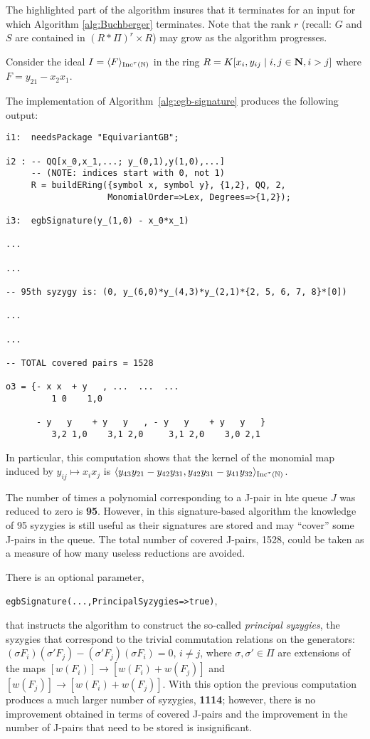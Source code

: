 The highlighted part of the algorithm insures that it terminates for an input for which Algorithm \ref{alg:Buchberger} terminates.
Note that the rank $r$ (recall: $G$ and $S$ are contained in $(R*\Pi)^r\times R$) may grow as the algorithm progresses. 

\begin{example}
Consider the ideal $I = \langle F \rangle_{\operatorname{Inc}^\tau(\mathbb N)}$ in the ring $R=K[x_i, y_{ij}\mid i,j\in\mathbf N, i>j]$ where $F = y_{21}-x_2x_1$.

The implementation of Algorithm~\ref{alg:egb-signature} produces the following output:
\begin{M2}
\begin{verbatim}
i1:  needsPackage "EquivariantGB";

i2 : -- QQ[x_0,x_1,...; y_(0,1),y(1,0),...] 
     -- (NOTE: indices start with 0, not 1)
     R = buildERing({symbol x, symbol y}, {1,2}, QQ, 2, 
                    MonomialOrder=>Lex, Degrees=>{1,2});

i3:  egbSignature(y_(1,0) - x_0*x_1)

...

...

-- 95th syzygy is: (0, y_(6,0)*y_(4,3)*y_(2,1)*{2, 5, 6, 7, 8}*[0])

...

...

-- TOTAL covered pairs = 1528
                     
o3 = {- x x  + y   , ...  ...  ...
         1 0    1,0  

      - y   y    + y   y   , - y   y    + y   y   }
         3,2 1,0    3,1 2,0     3,1 2,0    3,0 2,1
\end{verbatim}
\end{M2}  

In particular, this computation shows that the kernel of the monomial map induced by $y_{ij}\mapsto x_ix_j$ is 
$\langle y_{43}y_{21}-y_{42}y_{31},y_{42}y_{31}-y_{41}y_{32} \rangle_{\operatorname{Inc}^\tau(\mathbb N)}$.

The number of times a polynomial corresponding to a J-pair in hte queue $J$ was reduced to zero is {\bf 95}. However, in this signature-based algorithm the knowledge of 95 syzygies is still useful as their signatures are stored and may ``cover'' some J-pairs in the queue. The total number of covered J-pairs, 1528, could be taken as a measure of how many useless reductions are avoided.

There is an optional parameter, \begin{center} \verb|egbSignature(...,PrincipalSyzygies=>true)|,\end{center} that instructs the algorithm to construct the so-called \emph{principal syzygies}, the syzygies that correspond to the trivial commutation relations on the generators: $(\sigma F_i) (\sigma' F_j)-(\sigma'F_j)(\sigma F_i)=0$, $i\neq j$, where $\sigma,\sigma'\in\Pi$ are extensions of the maps $[w(F_i)] \to [w(F_i) + w(F_j)]$ and $ [w(F_j)] \to [w(F_i) + w(F_j)]$.
With this option the previous computation produces a much larger number of syzygies, {\bf 1114}; however, there is no improvement obtained in terms of covered J-pairs and the improvement in the number of J-pairs that need to be stored is insignificant. 


\end{example}
